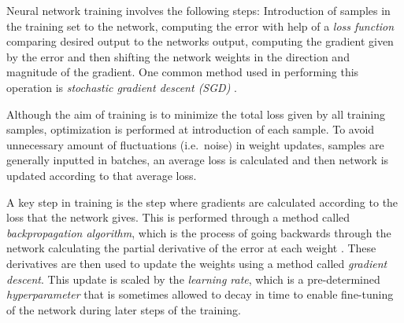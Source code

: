 Neural network training involves the following steps: Introduction of samples in the training set to the network, computing the error with help of a \textit{loss function} comparing desired output to the networks output, computing the gradient given by the error and then shifting the network weights in the direction and magnitude of the gradient. One common method used in performing this operation is \textit{stochastic gradient descent (SGD)} \citep{bengio_dl, sgd2}. 

Although the aim of training is to minimize the total loss given by all training samples, optimization is performed at introduction of each sample. To avoid unnecessary amount of fluctuations (i.e.~noise) in weight updates, samples are generally inputted in batches, an average loss is calculated and then network is updated according to that average loss.  

A key step in training is the step where gradients are calculated according to the loss that the network gives. This is performed through a method called \textit{backpropagation algorithm}, which is the process of going backwards through the network calculating the partial derivative of the error at each weight \citep{Rumelhart:1988:LRB:65669.104451}. These derivatives are then used to update the weights using a method called \textit{gradient descent}. This update is scaled by the \textit{learning rate}, which is a pre-determined \textit{hyperparameter} that is sometimes allowed to decay in time to enable fine-tuning of the network during later steps of the training. 




